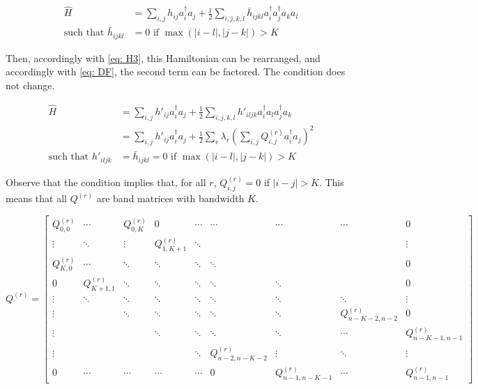\begin{equation}
    \begin{split}
        \hat{H} &= \sum_{i, j} h_{ij}a^\dag_ia_j + \frac{1}{2}\sum_{i,j,k,l} \bar{h}_{ijkl}a^\dag_ia^\dag_ja_ka_l \\
        \text{such that } \bar{h}_{ijkl} &= 0 \text{ if } \max(|i - l|, |j - k|) > K
    \end{split}
\end{equation}

Then, accordingly with \eqref{eq: H3}, this Hamiltonian can be rearranged, and accordingly with \eqref{eq: DF}, the second term can be factored. The condition does not change.

\begin{equation}
    \begin{split}
        \hat{H} &= \sum_{i, j} h'_{ij}a^\dag_ia_j + \frac{1}{2}\sum_{i,j,k,l} h'_{iljk}a^\dag_ia_la^\dag_ja_k \\
        &= \sum_{i, j} h'_{ij}a^\dag_ia_j + \frac{1}{2}\sum_r\lambda_r\left(\sum_{i,j} Q^{(r)}_{i, j}a^\dag_ia_j\right)^2 \\
        \text{such that } h'_{iljk} &= \bar{h}_{ijkl} = 0 \text{ if } \max(|i - l|, |j - k|) > K
    \end{split}
\end{equation}

Observe that the condition implies that, for all $r$, $Q^{(r)}_{i, j} = 0$ if $|i - j| > K$. This means that all $Q^{(r)}$ are band matrices with bandwidth $K$.

\begin{equation}
    Q^{(r)} = \begin{bmatrix}
        Q^{(r)}_{0, 0} & \cdots & Q^{(r)}_{0, K} & 0 & \cdots & \cdots & \cdots & \cdots & 0 \\
        \vdots & \ddots & \vdots & Q^{(r)}_{1, K + 1} & \ddots & & & & \vdots \\
        Q^{(r)}_{K, 0} & \cdots & \ddots & \ddots & \ddots & \ddots & & & 0 \\
        0 & Q^{(r)}_{K + 1, 1} & \ddots & \ddots & \ddots & \ddots & \ddots & & 0 \\
        \vdots & \ddots & \ddots & \ddots & \ddots & \ddots & \ddots & \ddots & \vdots \\
        \vdots & & \ddots & \ddots & \ddots & \ddots & \ddots & Q^{(r)}_{n - K - 2, n - 2} & 0 \\
        \vdots & & & \ddots & \ddots & \ddots & \ddots & \cdots & Q^{(r)}_{n - K - 1, n - 1} \\
        \vdots & & & & \ddots & Q^{(r)}_{n - 2, n - K - 2} & \vdots & \ddots & \vdots \\
        0 & \cdots & \cdots & \cdots & \cdots & 0 & Q^{(r)}_{n - 1, n - K - 1} & \cdots & Q^{(r)}_{n - 1, n - 1}
    \end{bmatrix}
\end{equation}

